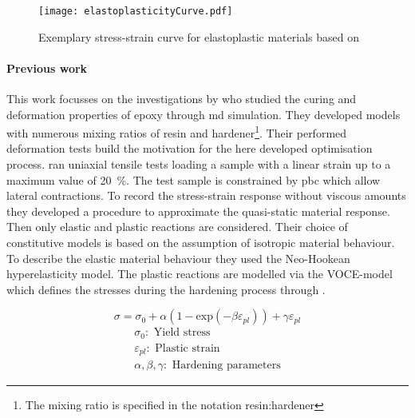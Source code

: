 \begin{figure}[H]
    \centering
    \texttt{[image: elastoplasticityCurve.pdf]}
    \caption{Exemplary stress-strain curve for elastoplastic materials based on \cite{mergheim_lecture_nodate}}
    \label{fig:elastoplasticityCurve}
\end{figure}




\paragraph{Previous work}
This work focusses on the investigations by \citet{ries_deciphering_nodate} who studied the curing and deformation properties of epoxy through \acrshort{md} simulation. They developed models with numerous mixing ratios of resin and hardener\footnote{The mixing ratio is specified in the notation resin:hardener}. Their performed deformation tests build the motivation for the here developed optimisation process. \citet{ries_deciphering_nodate} ran uniaxial tensile tests loading a sample with a linear strain up to a maximum value of 20 \%. The test sample is constrained by \acrshort{pbc} which allow lateral contractions. To record the stress-strain response without viscous amounts they developed a procedure to approximate the quasi-static material response. Then only elastic and plastic reactions are considered. Their choice of constitutive models is based on the assumption of isotropic material behaviour. To describe the elastic material behaviour they used the Neo-Hookean hyperelasticity model. The plastic reactions are modelled via the VOCE-model which defines the stresses during the hardening process through \cite{voce_practical_1948}.

\begin{equation} \label{eq: voce}
    \sigma = \sigma_0 + \alpha(1 - \text{exp}(-\beta \varepsilon_{pl})) + \gamma \varepsilon_{pl}
\end{equation}
\begin{gather*}
    \sigma_0: \text{ Yield stress} \\
    \varepsilon_{pl}: \text{ Plastic strain} \\
    \alpha, \beta,  \gamma: \text{ Hardening parameters}
\end{gather*}


